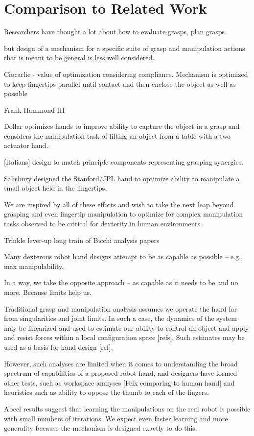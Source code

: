 \section{Comparison to Related Work}

Researchers have thought a lot about how to evaluate grasps, plan grasps

but design of a mechanism for a specific suite of grasp and manipulation actions that is meant to be general is less well considered.

Ciocarlie - value of optimization considering compliance.   Mechanism is optimized to keep fingertips parallel until contact and then enclose the object as well as possible

Frank Hammond III

Dollar optimizes hands to improve ability to capture the object in a grasp and considers the manipulation task of lifting an object from a table with a two actuator hand.

[Italians] design to match principle components representing grasping synergies.

Salisbury designed the Stanford/JPL hand to optimize ability to manipulate a small object held in the fingertips.

We are inspired by all of these efforts and wish to take the next leap beyond grasping and even fingertip manipulation to optimize for complex manipulation tasks observed to be critical for dexterity in human environments.

Trinkle lever-up
long train of Bicchi analysis papers


Many dexterous robot hand designs attempt to be as capable as possible -- e.g., max manipulability.  

In a way, we take the opposite approach -- as capable as it needs to be and no more.   Because limits help us.

Traditional grasp and manipulation analysis assumes we operate the hand far from singularities and joint limits.	   In such a case, the dynamics of the system may be linearized and used to estimate our ability to control an object and apply and resist forces within a local configuration space [refs].   Such estimates may be used as a basis for hand design [ref].

However, such analyses are limited when it comes to understanding the broad spectrum of capabilities of a proposed robot hand, and designers have formed other tests, such as workspace analyses [Feix comparing to human hand] and heuristics such as ability to oppose the thumb to each of the fingers.

Abeel results suggest that learning the manipulations on the real robot is possible with small numbers of iterations.   We expect even faster learning and more generality because the mechanism is designed exactly to do this.